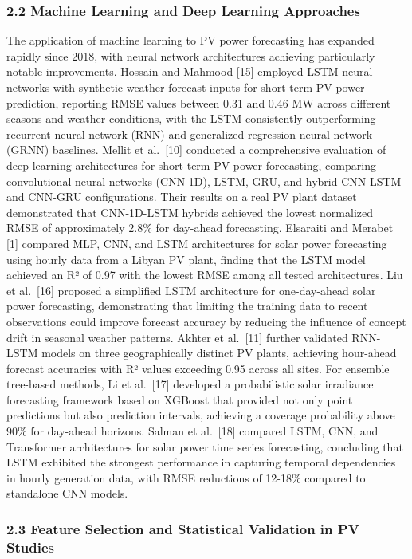 \documentclass[
  11pt,
]{article}
\begin{document}
\subsubsection{2.2 Machine Learning and Deep Learning
Approaches}\label{machine-learning-and-deep-learning-approaches}

The application of machine learning to PV power forecasting has expanded
rapidly since 2018, with neural network architectures achieving
particularly notable improvements. Hossain and Mahmood {[}15{]} employed
LSTM neural networks with synthetic weather forecast inputs for
short-term PV power prediction, reporting RMSE values between 0.31 and
0.46 MW across different seasons and weather conditions, with the LSTM
consistently outperforming recurrent neural network (RNN) and
generalized regression neural network (GRNN) baselines. Mellit et
al.~{[}10{]} conducted a comprehensive evaluation of deep learning
architectures for short-term PV power forecasting, comparing
convolutional neural networks (CNN-1D), LSTM, GRU, and hybrid CNN-LSTM
and CNN-GRU configurations. Their results on a real PV plant dataset
demonstrated that CNN-1D-LSTM hybrids achieved the lowest normalized
RMSE of approximately 2.8\% for day-ahead forecasting. Elsaraiti and
Merabet {[}1{]} compared MLP, CNN, and LSTM architectures for solar
power forecasting using hourly data from a Libyan PV plant, finding that
the LSTM model achieved an R² of 0.97 with the lowest RMSE among all
tested architectures. Liu et al.~{[}16{]} proposed a simplified LSTM
architecture for one-day-ahead solar power forecasting, demonstrating
that limiting the training data to recent observations could improve
forecast accuracy by reducing the influence of concept drift in seasonal
weather patterns. Akhter et al.~{[}11{]} further validated RNN-LSTM
models on three geographically distinct PV plants, achieving hour-ahead
forecast accuracies with R² values exceeding 0.95 across all sites. For
ensemble tree-based methods, Li et al.~{[}17{]} developed a
probabilistic solar irradiance forecasting framework based on XGBoost
that provided not only point predictions but also prediction intervals,
achieving a coverage probability above 90\% for day-ahead horizons.
Salman et al.~{[}18{]} compared LSTM, CNN, and Transformer architectures
for solar power time series forecasting, concluding that LSTM exhibited
the strongest performance in capturing temporal dependencies in hourly
generation data, with RMSE reductions of 12-18\% compared to standalone
CNN models.

\subsubsection{2.3 Feature Selection and Statistical Validation in PV
Studies}\label{feature-selection-and-statistical-validation-in-pv-studies}
\end{document}
